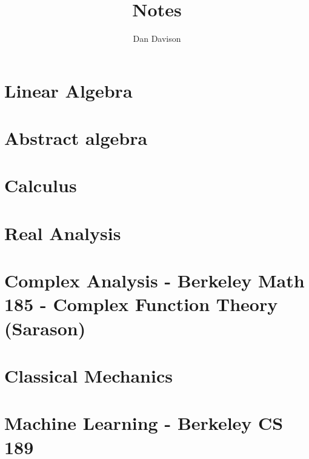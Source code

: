 \documentclass{book}
\title{Notes}
\author{Dan Davison}
\begin{document}
\frontmatter
\maketitle
\tableofcontents
\mainmatter

\chapter{Linear Algebra}


\chapter{Abstract algebra}


\chapter{Calculus}



\chapter{Real Analysis}


\chapter{Complex Analysis - Berkeley Math 185 - Complex Function Theory (Sarason)}


\chapter{Classical Mechanics}


\chapter{Machine Learning - Berkeley CS 189}


\end{document}
